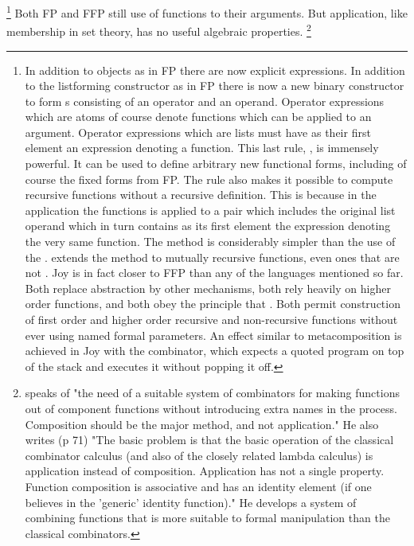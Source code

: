 \footnote{
In addition to objects as in FP there are now explicit expressions.
In addition to the listforming constructor as in FP
there is now a new binary constructor to form s
consisting of an operator and an operand.
Operator expressions which are atoms of course denote functions
which can be applied to an argument.
Operator expressions which are lists must have as their first
element an expression denoting a function.
This last rule, , is immensely powerful.
It can be used to define arbitrary new functional forms,
including of course the fixed forms from FP.
The rule also makes it possible to compute recursive functions
without a recursive definition.
This is because in the application
the functions is applied to a pair which includes the original
list operand which in turn contains as its first element
the expression denoting the very same function.
The method is considerably simpler than the
use of the .
extends the method to mutually recursive functions,
even ones that are not .
Joy is in fact closer to FFP than any of the languages mentioned
so far.
Both replace abstraction by other mechanisms,
both rely heavily on higher order functions,
and both obey the principle that .
Both permit construction of first order
and higher order recursive and non-recursive functions
without ever using named formal parameters.
An effect similar to metacomposition
is achieved in Joy with the  combinator,
which expects a quoted program on top of the stack
and executes it without popping it off.
}
Both FP and FFP still use 
of functions to their arguments.
But application, like membership in set theory,
has no useful algebraic properties.
\footnote{
speaks of
"the need of a suitable system of combinators
for making functions out of component functions
without introducing extra names in the process.
Composition should be the major method, and not application."
He also writes (p 71)
"The basic problem is that the basic operation of the classical combinator
calculus (and also of the closely related lambda calculus)
is application instead of composition.
Application has not a single property.
Function composition is associative
and has an identity element
(if one believes in the 'generic' identity function)."
He develops a system of combining functions
that is more suitable to formal manipulation
than the classical combinators.
}
